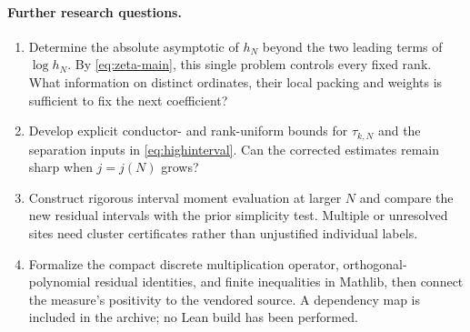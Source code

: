 \documentclass[11pt]{article}
\theoremstyle{remark}\newtheorem{remark}[theorem]{Remark}
\begin{document}
\paragraph{Further research questions.}
\begin{enumerate}
\item Determine the absolute asymptotic of $h_N$ beyond the two leading terms of $\log h_N$. By \eqref{eq:zeta-main}, this single problem controls every fixed rank. What information on distinct ordinates, their local packing and weights is sufficient to fix the next coefficient?
\item Develop explicit conductor- and rank-uniform bounds for $\tau_{k,N}$ and the separation inputs in \eqref{eq:highinterval}. Can the corrected estimates remain sharp when $j=j(N)$ grows?
\item Construct rigorous interval moment evaluation at larger $N$ and compare the new residual intervals with the prior simplicity test. Multiple or unresolved sites need cluster certificates rather than unjustified individual labels.
\item Formalize the compact discrete multiplication operator, orthogonal-polynomial residual identities, and finite inequalities in Mathlib, then connect the measure's positivity to the vendored source. A dependency map is included in the archive; no Lean build has been performed.
\end{enumerate}
\end{document}
